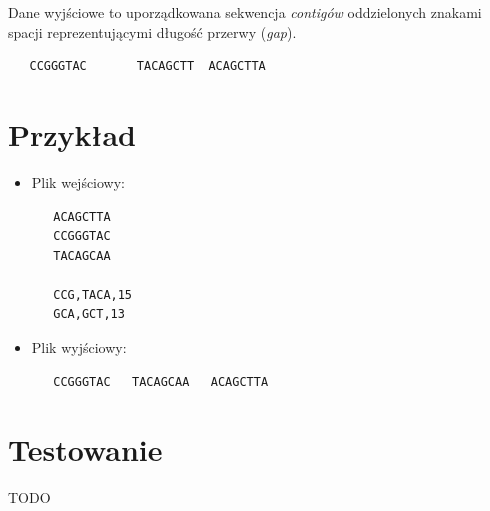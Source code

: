 \documentclass[a4paper,10pt]{article}
\begin{document}
Dane wyjściowe to uporządkowana sekwencja \emph{contigów} oddzielonych znakami spacji reprezentującymi długość przerwy (\emph{gap}).

  \begin{verbatim}
   CCGGGTAC       TACAGCTT  ACAGCTTA
  \end{verbatim}

\section*{Przykład}

\begin{itemize}
 \item Plik wejściowy:
  \begin{verbatim}
   ACAGCTTA
   CCGGGTAC
   TACAGCAA

   CCG,TACA,15
   GCA,GCT,13
  \end{verbatim}
 \item Plik wyjściowy:
  \begin{verbatim}
   CCGGGTAC   TACAGCAA   ACAGCTTA
  \end{verbatim}
\end{itemize}

\section*{Testowanie}
TODO
\end{document}
